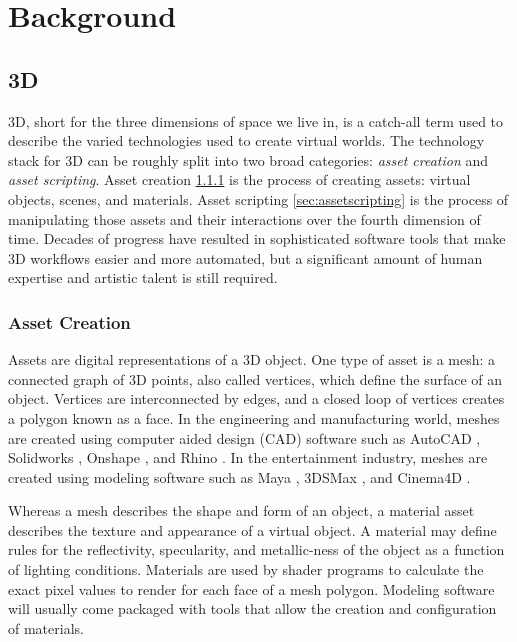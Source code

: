 \documentclass{article}
\begin{document}
\section{Background}
\label{sec:background}

\subsection{3D}
\label{sec:3d}

3D, short for the three dimensions of space we live in, is a catch-all term used to describe the varied technologies used to create virtual worlds. The technology stack for 3D can be roughly split into two broad categories: \emph{asset creation} and \emph{asset scripting}. Asset creation \ref{sec:assetcreation} is the process of creating assets: virtual objects, scenes, and materials. Asset scripting \ref{sec:assetscripting} is the process of manipulating those assets and their interactions over the fourth dimension of time. Decades of progress have resulted in sophisticated software tools that make 3D workflows easier and more automated, but a significant amount of human expertise and artistic talent is still required.
 
\subsubsection{Asset Creation}
\label{sec:assetcreation}

Assets are digital representations of a 3D object. One type of asset is a mesh: a connected graph of 3D points, also called vertices, which define the surface of an object. Vertices are interconnected by edges, and a closed loop of vertices creates a polygon known as a face. In the engineering and manufacturing world, meshes are created using computer aided design (CAD) software such as AutoCAD \citep{autocad}, Solidworks \citep{solidworks}, Onshape \citep{onshape}, and Rhino \citep{rhino}. In the entertainment industry, meshes are created using modeling software such as Maya \citep{maya}, 3DSMax \citep{3dsmax}, and Cinema4D \citep{cinema4d}.

Whereas a mesh describes the shape and form of an object, a material asset describes the texture and appearance of a virtual object. A material may define rules for the reflectivity, specularity, and metallic-ness of the object as a function of lighting conditions. Materials are used by shader programs to calculate the exact pixel values to render for each face of a mesh polygon. Modeling software will usually come packaged with tools that allow the creation and configuration of materials.
\end{document}

